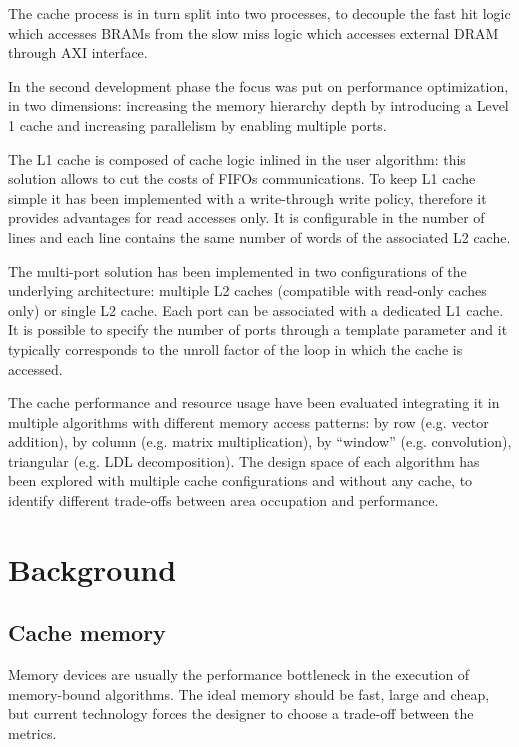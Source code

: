 \documentclass[11pt,a4paper]{memoir}
\begin{document}
The cache process is in turn split into two processes, to decouple the
fast hit logic which accesses BRAMs from the slow miss logic which accesses
external DRAM through AXI interface.

\bigskip
In the second development phase the focus was put on performance optimization,
in two dimensions: increasing the memory hierarchy depth by introducing a Level
1 cache and increasing parallelism by enabling multiple ports.

The L1 cache is composed of cache logic inlined in the user algorithm: this
solution allows to cut the costs of FIFOs communications. To keep L1 cache
simple it has been implemented with a write-through write policy, therefore
it provides advantages for read accesses only. It is configurable in the
number of lines and each line contains the same number of words of the
associated L2 cache.

The multi-port solution has been implemented in two configurations of the
underlying architecture: multiple L2 caches (compatible with read-only caches
only) or single L2 cache. Each port can be associated with a dedicated L1 cache.
It is possible to specify the number of ports through a template parameter and
it typically corresponds to the unroll factor of the loop in which the cache
is accessed.

\bigskip
The cache performance and resource usage have been evaluated integrating it in
multiple algorithms with different memory access patterns: by row (e.g.
vector addition), by column (e.g. matrix multiplication), by ``window''
(e.g. convolution), triangular (e.g. LDL decomposition).
The design space of each algorithm has been explored with multiple cache
configurations and without any cache, to identify different trade-offs between
area occupation and performance.

\pagebreak
\tableofcontents*

\mainmatter
\chapter{Background}
\section{Cache memory}
Memory devices are usually the performance bottleneck in the execution of
memory-bound algorithms.
The ideal memory should be fast, large and cheap, but current technology forces
the designer to choose a trade-off between the metrics.
\end{document}
